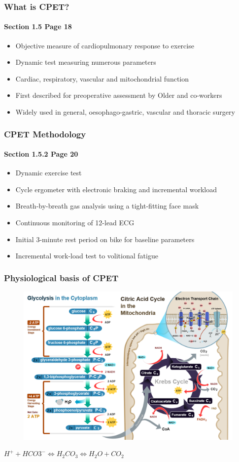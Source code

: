\documentclass[10pt]{beamer}
\begin{document}
\begin{frame}
	\frametitle{What is CPET?}
	\framesubtitle{Section 1.5 Page 18}
	\begin{itemize}
		\item Objective measure of cardiopulmonary response to exercise
		\item Dynamic test measuring numerous parameters
		\item Cardiac, respiratory, vascular and mitochondrial function
		\item First described for preoperative assessment by Older and co-workers
		\item Widely used in general, oesophago-gastric, vascular and thoracic surgery
	\end{itemize}
\end{frame}

\begin{frame}
	\frametitle{CPET Methodology}
	\framesubtitle{Section 1.5.2 Page 20 }
	\begin{itemize}
		\item Dynamic exercise test
		\item Cycle ergometer with electronic braking and incremental workload
		\item Breath-by-breath gas analysis using a tight-fitting face mask
		\item Continuous monitoring of 12-lead ECG
		\item Initial 3-minute rest period on bike for baseline parameters
		\item Incremental work-load test to volitional fatigue
	\end{itemize}
\end{frame}

\begin{frame}
	\frametitle{Physiological basis of CPET} 
	\begin{figure}
		\centering
		\includegraphics[width=0.5\linewidth]{CellRespiration}
		\label{fig:CellRespiration}
	\end{figure}
	\begin{block}
	\centering
	$H^+ + HCO3^- \Longleftrightarrow H_2CO_3 \Longleftrightarrow H_2O + CO_2$
	\end{block}

\end{frame}
\end{document}
